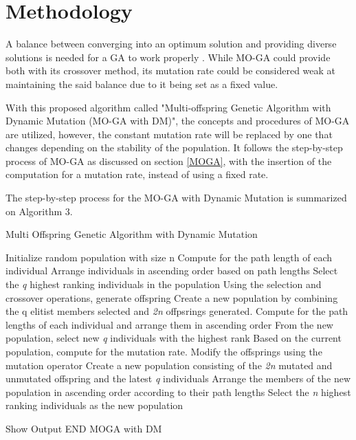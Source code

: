\chapter{Methodology}
\label{chap:Methodology}
A balance between converging into an optimum solution and providing diverse solutions is needed for a GA to work properly \cite{srinivas1994adaptive}. While MO-GA could provide both with its crossover method, its mutation rate could be considered weak at maintaining the said balance due to it being set as a fixed value. \par
With this proposed algorithm called "Multi-offspring Genetic Algorithm with Dynamic Mutation (MO-GA with DM)", the concepts and procedures of MO-GA are utilized, however, the constant mutation rate will be replaced by one that changes depending on the stability of the population. It follows the step-by-step process of MO-GA as discussed on section \ref{MOGA}, with the insertion of the computation for a mutation rate, instead of using a fixed rate. \par 

The step-by-step process for the MO-GA with Dynamic Mutation is summarized on Algorithm 3.

\begin{algorithm}[H]
	\label{alg:MogaDMAlg}
	\begin{algorithmic}
		\caption{Multi Offspring Genetic Algorithm with Dynamic Mutation}
		\State Initialize random population with size n
		\State Compute for the path length of each individual
		\EndFor
		\State Arrange individuals in ascending order based on path lengths
		\State Select the \emph{q} highest ranking individuals in the population
		\State Using the selection and crossover operations, generate offspring
		\EndFor
		\State Create a new population by combining the q elitist members selected and \emph{2n} offpsrings generated.
		\State Compute for the path lengths of each individual and arrange them in ascending order
		\State From the new population, select new \emph{q} individuals with the highest rank
		\State Based on the current population, compute for the mutation rate.
		\State Modify the offsprings using the mutation operator
		\EndFor
		\State Create a new population consisting of the \emph{2n} mutated and unmutated offspring and the latest \emph{q} individuals
		\State Arrange the members of the new population in ascending order according to their path lengths
		\State Select the \emph{n} highest ranking individuals as the new population
		
		\EndWhile
		\State Show Output 
		\State END MOGA with DM
	\end{algorithmic}
\end{algorithm}

